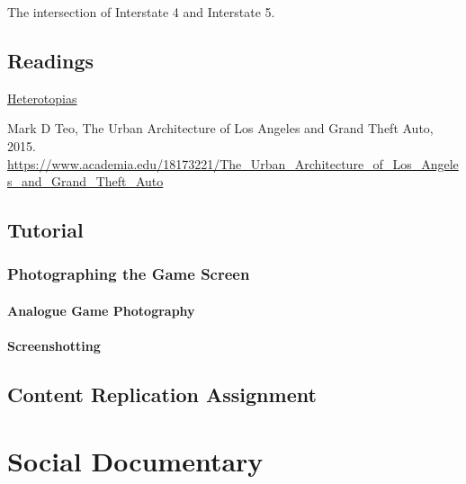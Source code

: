 \documentclass[
  openany]{book}
\begin{document}
The intersection of Interstate 4 and Interstate 5.

\hypertarget{readings}{%
\section*{Readings}\label{readings}}

\href{https://www.heterotopiaszine.com/}{Heterotopias}

Mark D Teo, The Urban Architecture of Los Angeles and Grand Theft Auto, 2015. \url{https://www.academia.edu/18173221/The_Urban_Architecture_of_Los_Angeles_and_Grand_Theft_Auto}

\hypertarget{tutorial}{%
\section*{Tutorial}\label{tutorial}}

\hypertarget{photographing-the-game-screen}{%
\subsection*{Photographing the Game Screen}\label{photographing-the-game-screen}}

\hypertarget{analogue-game-photography}{%
\subsubsection*{Analogue Game Photography}\label{analogue-game-photography}}

\hypertarget{screenshotting}{%
\subsubsection*{Screenshotting}\label{screenshotting}}

\hypertarget{content-replication-assignment}{%
\section*{Content Replication Assignment}\label{content-replication-assignment}}

\hypertarget{social-documentary}{%
\chapter{Social Documentary}\label{social-documentary}}
\end{document}
